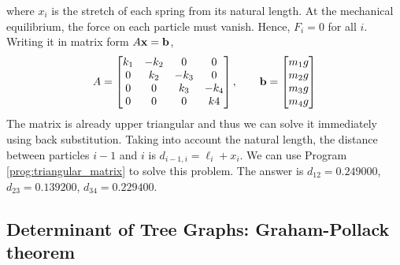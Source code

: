 \bigskip
\noindent
where $x_i$ is the stretch of each spring from its natural length.  At the mechanical equilibrium, the force on each particle must vanish.  Hence, $F_i=0$ for all $i$.  Writing it in matrix form
$A \vb{x} = \vb{b}$,
\begin{equation}
A = \begin{bmatrix} 
k_1 & -k_2 &    0 &    0 \\
  0 &  k_2 & -k_3 &    0\\
  0 &    0 &  k_3 &  -k_4 \\
  0 &    0 &    0 &  k4
 \end{bmatrix}, \qquad
\vb{b} =\begin{bmatrix} m_1 g \\ m_2 g \\ m_3 g \\ m_4 g \end{bmatrix}
\end{equation}
The matrix is already upper triangular and thus we can solve it immediately using back substitution.  Taking into account the natural length, the distance between particles $i-1$ and $i$ is $d_{i-1,i}=\ell_i + x_i$.  We can use Program \ref{prog:triangular_matrix} to solve this problem.  The answer is $d_{12}=0.249000$, $d_{23}=0.139200$, $d_{34}=0.229400$.


\subsection{Determinant of Tree Graphs: Graham-Pollack theorem}

